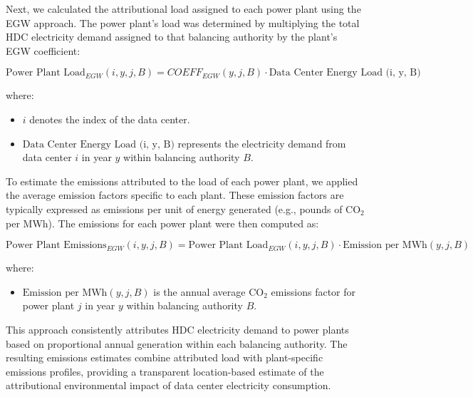 \documentclass[12pt]{article}
\begin{document}
Next, we calculated the attributional load assigned to each power plant using the EGW approach. The power plant's load was determined by multiplying the total HDC electricity demand assigned to that balancing authority by the plant's EGW coefficient:

\begin{equation}
\text{Power Plant Load}_{EGW}(i, y, j, B) = COEFF_{EGW}(y, j, B) \cdot \text{Data Center Energy Load (i, y, B)}
\end{equation}

where:
\begin{itemize}
    \item $i$ denotes the index of the data center.
    \item $\text{Data Center Energy Load (i, y, B)}$ represents the electricity demand from data center $i$ in year $y$ within balancing authority $B$.
\end{itemize}

To estimate the emissions attributed to the load of each power plant, we applied the average emission factors specific to each plant. These emission factors are typically expressed as emissions per unit of energy generated (e.g., pounds of CO$_2$ per MWh). The emissions for each power plant were then computed as:

\begin{equation}
\text{Power Plant Emissions}_{EGW}(i, y, j, B) = \text{Power Plant Load}_{EGW}(i, y, j, B) \cdot \text{Emission per MWh}(y, j, B)
\end{equation}

where:
\begin{itemize}
    \item $\text{Emission per MWh}(y, j, B)$ is the annual average CO$_2$ emissions factor for power plant $j$ in year $y$ within balancing authority $B$.
\end{itemize}

This approach consistently attributes HDC electricity demand to power plants based on proportional annual generation within each balancing authority. The resulting emissions estimates combine attributed load with plant-specific emissions profiles, providing a transparent location-based estimate of the attributional environmental impact of data center electricity consumption.
\end{document}
